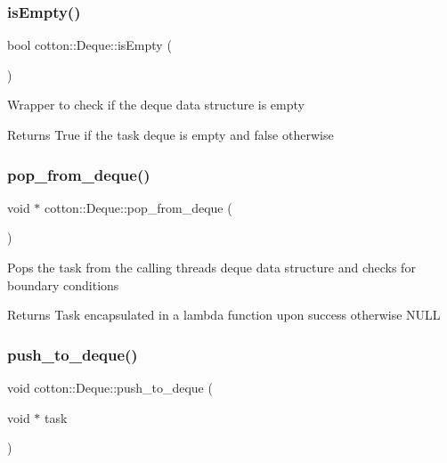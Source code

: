 \subsubsection{\texorpdfstring{is\+Empty()}{isEmpty()}}
{\footnotesize\ttfamily bool cotton\+::\+Deque\+::is\+Empty (\begin{DoxyParamCaption}{ }\end{DoxyParamCaption})}

Wrapper to check if the deque data structure is empty

\begin{DoxyReturn}{Returns}
True if the task deque is empty and false otherwise 
\end{DoxyReturn}
\mbox{\label{structcotton_1_1Deque_a206682dc43f6b981adcf3c10c6696f1b}} 
\subsubsection{\texorpdfstring{pop\+\_\+from\+\_\+deque()}{pop\_from\_deque()}}
{\footnotesize\ttfamily void $\ast$ cotton\+::\+Deque\+::pop\+\_\+from\+\_\+deque (\begin{DoxyParamCaption}{ }\end{DoxyParamCaption})}

Pops the task from the calling thread\textquotesingle{}s deque data structure and checks for boundary conditions

\begin{DoxyReturn}{Returns}
Task encapsulated in a lambda function upon success otherwise N\+U\+LL 
\end{DoxyReturn}
\mbox{\label{structcotton_1_1Deque_a482281bb7b1afec18e0f324156c2ad27}} 
\subsubsection{\texorpdfstring{push\+\_\+to\+\_\+deque()}{push\_to\_deque()}}
{\footnotesize\ttfamily void cotton\+::\+Deque\+::push\+\_\+to\+\_\+deque (\begin{DoxyParamCaption}\item[{void $\ast$}]{task }\end{DoxyParamCaption})}

